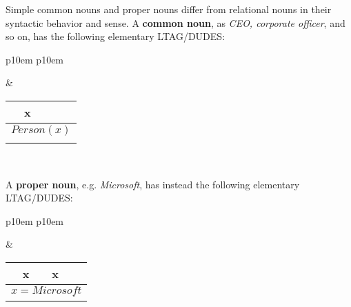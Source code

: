 Simple common nouns and proper nouns differ from relational nouns in their syntactic behavior and sense. A \textbf{common noun}, as \textit{CEO, corporate officer}, and so on, has the following elementary LTAG/DUDES:

\medskip
\begin{center}
\begin{tabular}{ p{10em} p{10em} }
	\label{tbl:grammar.people}
	
	\begin{center}
		\begin{tikzpicture}
		\Tree [.NP people ]
		\end{tikzpicture}
	\end{center}
		
	&
	
	\begin{center}
		\begin{tabular}{|c|l|}
			\hline
			x & \mbox{}\\ 
			\hline
			\multicolumn{2}{|l|}{
				$Person(x)$
			} \\
			\hline
			\multicolumn{2}{|l|}{
				\mbox{}
			} \\
			\hline
		\end{tabular}
	\end{center}	
	\\
\end{tabular}
\end{center}
\medskip

A \textbf{proper noun}, e.g. \textit{Microsoft}, has instead the following elementary LTAG/DUDES:
 
\medskip
\begin{center}
\begin{tabular}{ p{10em} p{10em} }
	\label{tbl:grammar.microsoft}
	
	\begin{center}
		\begin{tikzpicture}
		\Tree [.DP Microsoft ]
		\end{tikzpicture}
	\end{center}
		
	&
	
	\begin{center}
		\begin{tabular}{|c|l|}
			\hline
			x & x\\ 
			\hline
			\multicolumn{2}{|l|}{
				$x=Microsoft$
			} \\

			\hline
			\multicolumn{2}{|l|}{
				\mbox{}
			} \\
			\hline
		\end{tabular}
	\end{center}	
	\\
\end{tabular}
\end{center}
\medskip

